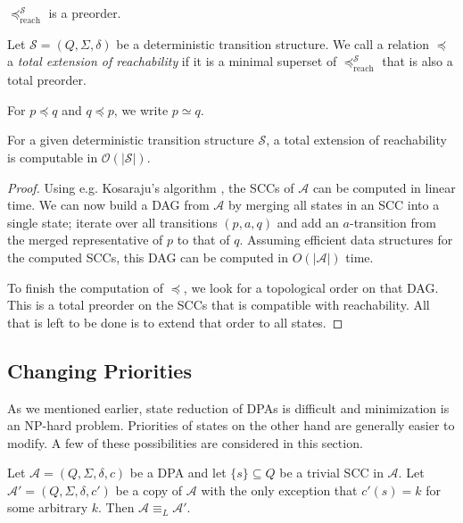 \begin{lem}
	$\preceq_\text{reach}^\mathcal{S}$ is a preorder.
\end{lem}

\begin{defn}
	Let $\mathcal{S} = (Q, \Sigma, \delta)$ be a deterministic transition structure. We call a relation $\preceq$ a \emph{total extension of reachability} if it is a minimal superset of $\preceq_\text{reach}^\mathcal{S}$ that is also a total preorder.
	
	For $p \preceq q$ and $q \preceq p$, we write $p \simeq q$.
\end{defn}

\begin{lem}
	For a given deterministic transition structure $\mathcal{S}$, a total extension of reachability is computable in $\mathcal{O}(|\mathcal{S}|)$.
	\label{lem:general:reach_topo_lintime}
\end{lem}

\begin{proof}
	Using e.g. Kosaraju's algorithm \cite{Sharir81}, the SCCs of $\mathcal{A}$ can be computed in linear time. We can now build a DAG from $\mathcal{A}$ by merging all states in an SCC into a single state; iterate over all transitions $(p, a, q)$ and add an $a$-transition from the merged representative of $p$ to that of $q$. Assuming efficient data structures for the computed SCCs, this DAG can be computed in $O(|\mathcal{A}|)$ time.
	
	To finish the computation of $\preceq$, we look for a topological order on that DAG. This is a total preorder on the SCCs that is compatible with reachability. All that is left to be done is to extend that order to all states.
\end{proof}




\subsection{Changing Priorities}
As we mentioned earlier, state reduction of DPAs is difficult and minimization is an NP-hard problem. Priorities of states on the other hand are generally easier to modify. A few of these possibilities are considered in this section.

\begin{lem}
\label{lem:general:trivial_scc_dont_matter}
	Let $\mathcal{A} = (Q, \Sigma, \delta, c)$ be a DPA and let $\{s\} \subseteq Q$ be a trivial SCC in $\mathcal{A}$. Let $\mathcal{A}' = (Q, \Sigma, \delta, c')$ be a copy of $\mathcal{A}$ with the only exception that $c'(s) = k$ for some arbitrary $k$. Then $\mathcal{A} \equiv_L \mathcal{A}'$.
\end{lem}

